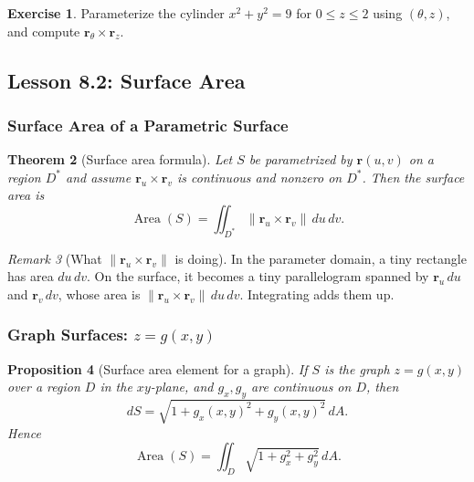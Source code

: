 \documentclass[12pt]{article}
\numberwithin{equation}{section}
\newcommand{\vect}[1]{\boldsymbol{#1}}   %
\theoremstyle{plain}
\newtheorem{theorem}{Theorem}[section]
\newtheorem{proposition}[theorem]{Proposition}
\theoremstyle{definition}
\newtheorem{exercise}[theorem]{Exercise}
\theoremstyle{remark}
\newtheorem{remark}[theorem]{Remark}
\begin{document}
\begin{exercise}
Parameterize the cylinder $x^2+y^2=9$ for $0\le z\le 2$ using $(\theta,z)$, and compute $\vect r_\theta\times \vect r_z$.
\end{exercise}

\subsection{Lesson 8.2: Surface Area}

\subsubsection{Surface Area of a Parametric Surface}

\begin{theorem}[Surface area formula]\label{thm:surface-area}
Let $S$ be parametrized by $\vect r(u,v)$ on a region $D^\ast$ and assume $\vect r_u\times \vect r_v$ is continuous and nonzero on $D^\ast$. Then the surface area is
\begin{equation}\label{eq:surface-area}
\operatorname{Area}(S)=\iint_{D^\ast}\bigl\|\vect r_u\times \vect r_v\bigr\|\,du\,dv.
\end{equation}
\end{theorem}

\begin{remark}[What $\|\vect r_u\times \vect r_v\|$ is doing]
In the parameter domain, a tiny rectangle has area $du\,dv$. On the surface, it becomes a tiny parallelogram spanned by $\vect r_u\,du$ and $\vect r_v\,dv$, whose area is $\|\vect r_u\times \vect r_v\|\,du\,dv$. Integrating adds them up.
\end{remark}

\subsubsection{Graph Surfaces: $z=g(x,y)$}

\begin{proposition}[Surface area element for a graph]\label{prop:graph-dS}
If $S$ is the graph $z=g(x,y)$ over a region $D$ in the $xy$-plane, and $g_x,g_y$ are continuous on $D$, then
\begin{equation}\label{eq:dS-graph}
dS=\sqrt{1+g_x(x,y)^2+g_y(x,y)^2}\,dA.
\end{equation}
Hence
\[
\operatorname{Area}(S)=\iint_D \sqrt{1+g_x^2+g_y^2}\,dA.
\]
\end{proposition}
\end{document}

